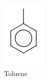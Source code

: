 \begin{figure}[H]
    \centering
\begin{subfigure}[b]{.14\textwidth}
\includegraphics[width=\textwidth]{figures_c3/TOLUENE.png}
\caption{Toluene}
\end{subfigure}
\begin{subfigure}[b]{.14\textwidth}

\end{subfigure}
\end{figure}

